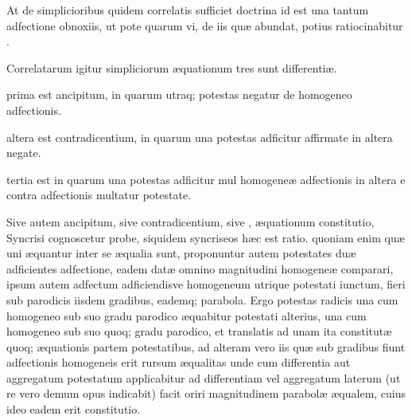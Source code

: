 \documentclass[11pt,a4paper]{article}
\begin{document}
At de simplicioribus quidem correlatis sufficiet doctrina id est una tantum adfectione obnoxiis, ut pote quarum vi, de iis quæ  abundat,  potius ratiocinabitur \ill{}.

Correlatarum igitur simpliciorum æquationum tres sunt differentiæ.

prima est ancipitum, in quarum utraq; potestas negatur de homogeneo adfectionis.

altera est contradicentium, in quarum una potestas adficitur affirmate in altera negate.

tertia est  in quarum una potestas adficitur mul homogeneæ adfectionis in altera e contra  adfectionis multatur potestate.


Sive autem ancipitum, sive contradicentium, sive , æquationum constitutio, Syncrisi cognoscetur probe,  siquidem syncriseos hæc est ratio. quoniam enim quæ uni æquantur inter se æqualia sunt, proponuntur autem potestates duæ adficientes adfectione, eadem datæ omnino magnitudini homogeneæ comparari, ipsum autem adfectum adficiendisve homogeneum utrique potestati iunctum, fieri sub parodicis iisdem gradibus, eademq; parabola. Ergo potestas radicis una cum homogeneo sub suo gradu parodico æquabitur potestati alterius, una cum homogeneo sub suo quoq; gradu parodico, et translatis ad unam ita constitutæ quoq; æquationis partem potestatibus, ad alteram vero iis quæ sub gradibus fiunt adfectionis homogeneis erit rursum æqualitas unde cum differentia aut aggregatum potestatum applicabitur ad differentiam vel aggregatum laterum (ut re vero demum opus indicabit) facit oriri magnitudinem parabolæ æqualem, cuius ideo eadem erit constitutio.
\end{document}
